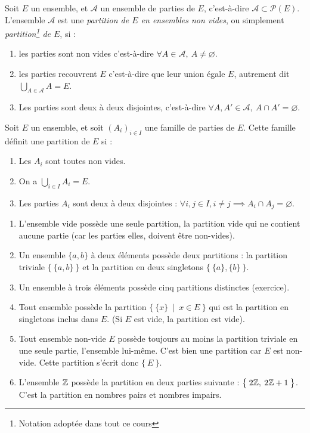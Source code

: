 \begin{definition}
Soit $E$ un ensemble, et $\mathcal A$ un ensemble de parties de $E$, c'est-à-dire $\mathcal A\subset \mathcal P(E)$. L'ensemble $\mathcal A$ est une \emph{partition de $E$ en ensembles non vides}, ou simplement \emph{partition\footnote{Notation adoptée dans tout ce cours} de $E$}, si : 
\begin{enumerate}
\item les parties sont non vides c'est-à-dire $\forall A\in \mathcal A, \: A\neq \varnothing$.
\item les parties recouvrent $E$ c'est-à-dire que leur union égale $E$, autrement dit $\bigcup_{A\in \mathcal A} A = E$.
\item Les parties sont deux à deux disjointes, c'est-à-dire $\forall A, A' \in \mathcal A, \: A\cap A' = \varnothing$.
\end{enumerate}
\end{definition}

\begin{exemple}
Soit $E$ un ensemble, et soit $(A_i)_{i\in I}$ une famille de parties de $E$. Cette famille définit une partition de $E$ si :
\begin{enumerate}
\item Les $A_i$ sont toutes non vides.
\item On a $\bigcup_{i\in I} A_i = E$.
\item Les parties $A_i$ sont deux à deux disjointes : $\forall i, j\in I, i\neq j \implies A_i\cap A_j=\varnothing$.
\end{enumerate}
\end{exemple}

\begin{exemple}
\begin{enumerate}
\item L'ensemble vide possède une seule partition, la partition vide qui ne contient aucune partie (car les parties elles, doivent être non-vides).
\item Un ensemble $\{a,b\}$ à deux éléments possède deux partitions : la partition triviale $\big\{\: \{a,b\} \:\big\}$ et la partition en deux singletons $\big\{\: \{a\},\{b\} \:\big\}$.
\item Un ensemble à trois éléments possède cinq partitions distinctes (exercice).
\item Tout ensemble possède la partition $\big\{\: \{x\}\:\mid\: x\in E \:\big\}$ qui est la partition en singletons inclus dans $E$. (Si $E$ est vide, la partition est vide).
\item Tout ensemble non-vide $E$ possède toujours au moins la partition triviale en une seule partie, l'ensemble lui-même. C'est bien une partition car $E$ est non-vide. Cette partition s'écrit donc $\big\{\: E \:\big\}$.
\item L'ensemble $\mathbb{Z}$ possède la partition en deux parties suivante : $\big\{\: 2\mathbb{Z}, \: 2\mathbb{Z}+1\:\big\}$. C'est la partition en nombres pairs et nombres impairs.
\end{enumerate}
\end{exemple}

